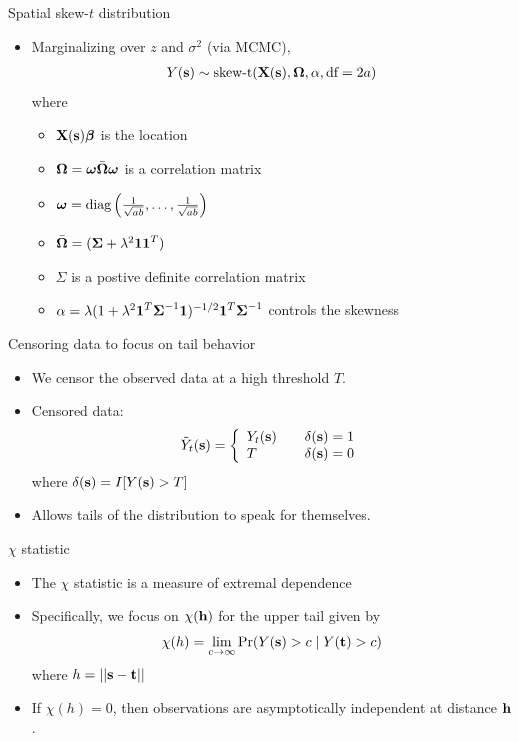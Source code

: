 \documentclass{beamer}
\begin{document}
\begin{frame}{Spatial skew-$t$ distribution}
  \begin{itemize} \setlength{\itemsep}{0.5em}
    \item \alert{Marginalizing} over $z$ and $\sigma^2$ (via MCMC),
    \begin{align*}
      Y(\mbox{\bf s}) \sim \text{skew-t}(\mbox{\bf X}(\mbox{\bf s}), \mbox{\boldmath $\Omega$}, \alpha, \text{df}=2a)
    \end{align*}
    where
    \begin{itemize}
      \item $\mbox{\bf X}(\mbox{\bf s}) \mbox{\boldmath $\beta$}$ is the location
      \item $\mbox{\boldmath $\Omega$} = \mbox{\boldmath $\omega$} \bar{\mbox{\boldmath $\Omega$}} \mbox{\boldmath $\omega$}$ is a correlation matrix
      \item $\mbox{\boldmath $\omega$} = \text{diag} \left(\frac{1}{\sqrt{ab}}, \ldots, \frac{1}{ \sqrt{ab}}\right)$
      \item $\bar{\mbox{\boldmath $\Omega$}} = (\mbox{\boldmath $\Sigma$} + \lambda^2 \mbox{\boldmath $1$} \mbox{\boldmath $1$}^T)$
      \item $\Sigma$ is a postive definite correlation matrix
      \item $\alpha = \lambda( 1 + \lambda^2 \mbox{\boldmath $1$}^T \mbox{\boldmath $\Sigma$}^{-1} \mbox{\boldmath $1$})^{-1/2} \mbox{\boldmath $1$}^T \mbox{\boldmath $\Sigma$}^{-1}$ controls the skewness
    \end{itemize}
  \end{itemize}
\end{frame}

\begin{frame}{Censoring data to focus on tail behavior}
  \begin{itemize} \setlength{\itemsep}{0.5em}
    \item We censor the observed data at a high threshold $T$.
    \item Censored data:
    \begin{align*}
      \tilde{Y}_t(\mbox{\bf s}) = \left\{ \begin{array}{ll}
          Y_t(\mbox{\bf s}) \quad & \delta(\mbox{\bf s}) = 1\\
          T \quad & \delta(\mbox{\bf s}) = 0
      \end{array}\right.
    \end{align*}
    where $\delta(\mbox{\bf s}) = I[Y(\mbox{\bf s}) > T]$
    \item Allows tails of the distribution to speak for themselves.
  \end{itemize}
\end{frame}

\begin{frame}{$\chi$ statistic}
  \begin{itemize} \setlength{\itemsep}{0.5em}
   \item The $\chi$ statistic is a measure of extremal dependence
   \item Specifically, we focus on $\chi(\mbox{\bf h})$ for the upper tail given by
    \begin{align*}
      \chi(h) = \lim_{c \rightarrow \infty}\Pr(Y(\mbox{\bf s}) > c \mid Y(\mbox{\bf t}) > c)
    \end{align*}
    where $h = ||\mbox{\bf s} - \mbox{\bf t}||$
    \item If $ \chi(h) = 0$, then observations are asymptotically independent at distance $\mbox{\bf h}$.
  \end{itemize}
\end{frame}
\end{document}
